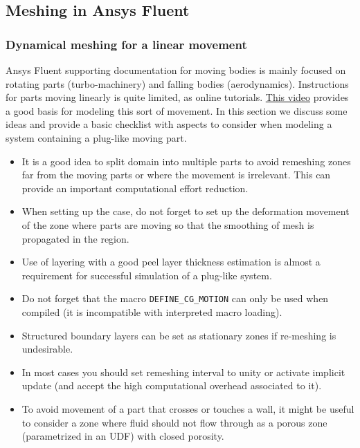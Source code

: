 \subsection{Meshing in Ansys Fluent}

\subsubsection{Dynamical meshing for a linear movement}

Ansys Fluent supporting documentation for moving bodies is mainly focused on rotating parts (turbo-machinery) and falling bodies (aerodynamics). Instructions for parts moving linearly is quite limited, as online tutorials. \href{https://www.youtube.com/watch?v=fbaV_knzzks}{This video} provides a good basis for modeling this sort of movement. In this section we discuss some ideas and provide a basic checklist with aspects to consider when modeling a system containing a plug-like moving part.

\begin{itemize}
\item It is a good idea to split domain into multiple parts to avoid remeshing zones far from the moving parts or where the movement is irrelevant. This can provide an important computational effort reduction.

\item When setting up the case, do not forget to set up the deformation movement of the zone where parts are moving so that the smoothing of mesh is propagated in the region.

\item Use of layering with a good peel layer thickness estimation is almost a requirement for successful simulation of a plug-like system.

\item Do not forget that the macro \verb+DEFINE_CG_MOTION+ can only be used when compiled (it is incompatible with interpreted macro loading).

\item Structured boundary layers can be set as stationary zones if re-meshing is undesirable.

\item In most cases you should set remeshing interval to unity or activate implicit update (and accept the high computational overhead associated to it).

\item To avoid movement of a part that crosses or touches a wall, it might be useful to consider a zone where fluid should not flow through as a porous zone (parametrized in an UDF) with closed porosity.
\end{itemize}

\endinput